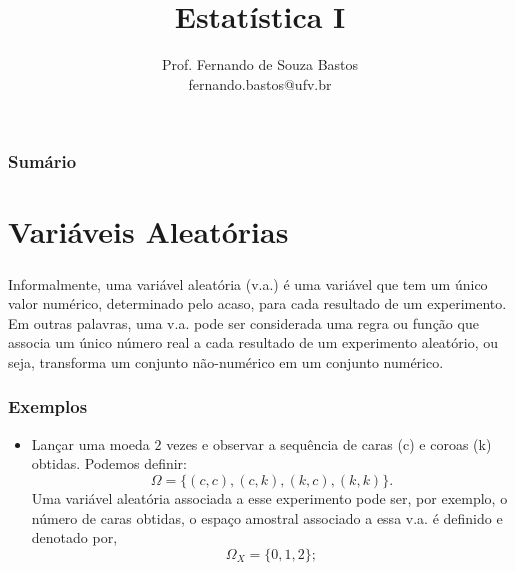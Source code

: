 \documentclass[14pt,aspectratio=1610]{beamer}
\title{Estatística I}
\author{Prof. Fernando de Souza Bastos \texorpdfstring{\\ fernando.bastos@ufv.br}{}}
\institute{Departamento de Estatística \texorpdfstring{\\ Universidade Federal de Viçosa}{}\texorpdfstring{\\ Campus UFV - Viçosa}{}}
\date{}
\begin{document}
%

\frame{\titlepage}

\begin{frame}{}
\frametitle{\bf Sumário}
\tableofcontents
\end{frame}

\section{Variáveis Aleatórias}
\begin{frame}{}
\frametitle{}
\begin{block}{}
\justifying
Informalmente, uma variável aleatória (v.a.) é uma variável que tem um único valor numérico, determinado pelo acaso, para cada resultado de um experimento. Em outras palavras, uma v.a. pode ser considerada uma regra ou função que associa um único número real a cada resultado de um experimento aleatório, ou seja, transforma um conjunto não-numérico em um conjunto numérico.
\end{block}
\end{frame}

\begin{frame}{}
\frametitle{Exemplos}
\begin{block}{}
\justifying
\begin{itemize}
\item Lançar uma moeda $2$ vezes e observar a sequência de caras (c) e coroas (k) obtidas. Podemos definir: $$\Omega=\{(c,c),(c,k),(k,c),(k,k)\}.$$ Uma variável aleatória associada a esse experimento pode ser, por exem\-plo, o número de caras obtidas, o espaço amostral associado a essa v.a. é definido e denotado por, $$\Omega_{X}=\{0,1,2\};$$
\end{itemize}
\end{block}
\end{frame}

\end{document}

